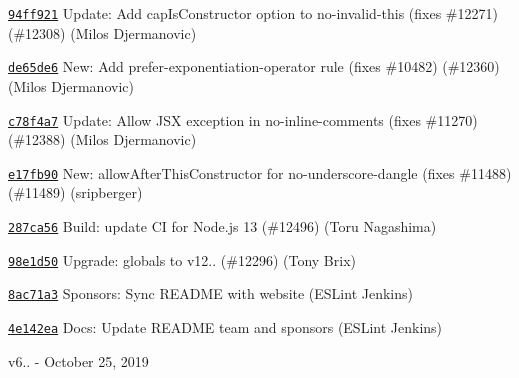 \begin{DoxyItemize}
\item \href{https://github.com/eslint/eslint/commit/94ff921689115f856578159564ee1968b4b914be}{\texttt{ {\ttfamily 94ff921}}} Update\+: Add cap\+Is\+Constructor option to no-\/invalid-\/this (fixes \#12271) (\#12308) (Milos Djermanovic)
\item \href{https://github.com/eslint/eslint/commit/de65de6e488112a602949e6a5d27dd4c754b003c}{\texttt{ {\ttfamily de65de6}}} New\+: Add prefer-\/exponentiation-\/operator rule (fixes \#10482) (\#12360) (Milos Djermanovic)
\item \href{https://github.com/eslint/eslint/commit/c78f4a73de68f81cd41132b46d4840b91599d599}{\texttt{ {\ttfamily c78f4a7}}} Update\+: Allow JSX exception in no-\/inline-\/comments (fixes \#11270) (\#12388) (Milos Djermanovic)
\item \href{https://github.com/eslint/eslint/commit/e17fb90f5817d16081e690eb06b7720afcb9fa2a}{\texttt{ {\ttfamily e17fb90}}} New\+: allow\+After\+This\+Constructor for no-\/underscore-\/dangle (fixes \#11488) (\#11489) (sripberger)
\item \href{https://github.com/eslint/eslint/commit/287ca562811d037bde09a47af7f5b9c7b741e022}{\texttt{ {\ttfamily 287ca56}}} Build\+: update CI for Node.\+js 13 (\#12496) (Toru Nagashima)
\item \href{https://github.com/eslint/eslint/commit/98e1d50273f31c2a7b59772298280ed7305274c8}{\texttt{ {\ttfamily 98e1d50}}} Upgrade\+: globals to v12.. (\#12296) (Tony Brix)
\item \href{https://github.com/eslint/eslint/commit/8ac71a3c89a9db13706a44b23d1b509b65185113}{\texttt{ {\ttfamily 8ac71a3}}} Sponsors\+: Sync README with website (ESLint Jenkins)
\item \href{https://github.com/eslint/eslint/commit/4e142ea411dfb692b6e2a69cd5f1204ade4dd58a}{\texttt{ {\ttfamily 4e142ea}}} Docs\+: Update README team and sponsors (ESLint Jenkins)
\end{DoxyItemize}

v6.. -\/ October 25, 2019


